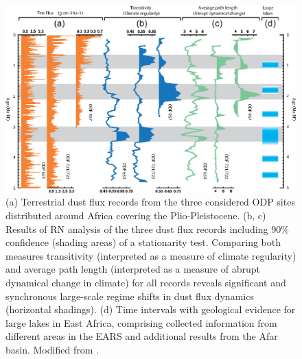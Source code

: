 		\begin{figure}[htbp]
		\centering
			\includegraphics[width=\textwidth]{Chapter06_Applications/appl_recurrence_network.eps}
		\caption{(a) Terrestrial dust flux records from the three considered ODP sites distributed around Africa covering the Plio-Pleistocene. (b, c) Results of RN analysis of the three dust flux records including 90\% confidence (shading areas) of a stationarity test. Comparing both measures transitivity (interpreted as a measure of climate regularity) and average path length (interpreted as a measure of abrupt dynamical change in climate) for all records reveals significant and synchronous large-scale regime shifts in dust flux dynamics (horizontal shadings). (d) Time intervals with geological evidence for large lakes in East Africa, comprising collected information from different areas in the EARS and additional results from the Afar basin. Modified from \cite{Donges2011a}. } \label{fig:appl_recurrence_network}
		\end{figure}

